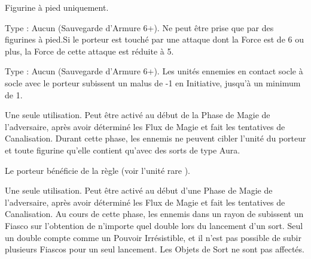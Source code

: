 \endpricelist

\armymagicalarmour

\startpricelist

Figurine à pied uniquement.

Type : Aucun (Sauvegarde d'Armure 6+). Ne peut être prise que par des figurines à pied.\newline Si le porteur est touché par une attaque dont la Force est de 6 ou plus, la Force de cette attaque est réduite à 5.

Type : Aucun (Sauvegarde d'Armure 6+). Les unités ennemies en contact socle à socle avec le porteur subissent un malus de -1 en Initiative, jusqu'à un minimum de 1.

\endpricelist

\armytalismans

\startpricelist

Une seule utilisation. Peut être activé au début de la Phase de Magie de l'adversaire, après avoir déterminé les Flux de Magie et fait les tentatives de Canalisation. Durant cette phase, les \wizards{} ennemis ne peuvent cibler l'unité du porteur et toute figurine qu'elle contient qu'avec des sorts de type Aura.

\endpricelist

\armyenchanteditems

\startpricelist

Le porteur bénéficie de la règle \stoneskin{} (voir l'unité rare \rockaurochs{}).

\endpricelist

\armyarcaneitems

\startpricelist

Une seule utilisation. Peut être activé au début d'une Phase de Magie de l'adversaire, après avoir déterminé les Flux de Magie et fait les tentatives de Canalisation. Au cours de cette phase, les \wizards{} ennemis dans un rayon de  subissent un Fiasco sur l'obtention de n'importe quel double lors du lancement d'un sort. Seul un double  compte comme un Pouvoir Irrésistible, et il n'est pas possible de subir plusieurs Fiascos pour un seul lancement. Les Objets de Sort ne sont pas affectés.

\endpricelist

\armymagicalbanners

